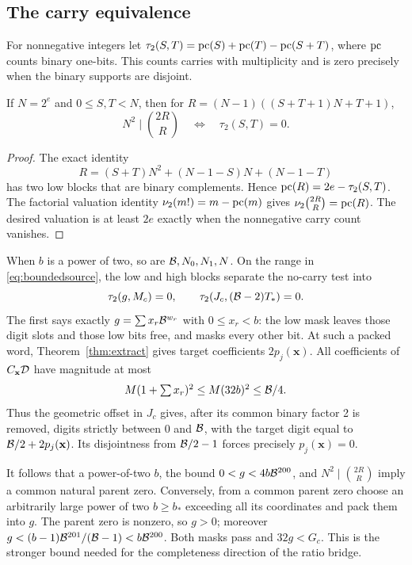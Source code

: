 \subsection{The carry equivalence}
For nonnegative integers let
$\tau_2(S,T)=\operatorname{pc}(S)+\operatorname{pc}(T)-\operatorname{pc}(S+T)$, where $\operatorname{pc}$ counts binary
one-bits. This counts carries with multiplicity and is zero precisely
when the binary supports are disjoint.

\begin{lemma}\label{lem:carry}
If $N=2^e$ and $0\le S,T<N$, then for
$R=(N-1)((S+T+1)N+T+1)$,
\[
 N^2\mid\binom{2R}{R}\quad\Longleftrightarrow\quad\tau_2(S,T)=0.
\]
\end{lemma}
\begin{proof}
The exact identity
\[
R=(S+T)N^2+(N-1-S)N+(N-1-T)
\]
has two low blocks that are binary complements. Hence
$\operatorname{pc}(R)=2e-\tau_2(S,T)$. The factorial valuation identity
$\nu_2(m!)=m-\operatorname{pc}(m)$ gives
$\nu_2\binom{2R}{R}=\operatorname{pc}(R)$. The desired valuation is at least
$2e$ exactly when the nonnegative carry count vanishes.
\end{proof}

When $b$ is a power of two, so are $\mathcal B,N_0,N_1,N$.
On the range in \eqref{eq:boundedsource}, the low and high blocks
separate the no-carry test into
\[
\tau_2(g,M_c)=0,\qquad
\tau_2(J_c,(\mathcal B-2)T_*)=0.
\]
The first says exactly
$g=\sum x_r\mathcal B^{w_r}$ with $0\le x_r<b$: the low mask leaves
those digit slots and those low bits free, and masks every other bit.
At such a packed word, Theorem~\ref{thm:extract} gives target
coefficients $2p_j(\mathbf x)$. All coefficients of
$C_{\mathbf x}\mathcal D$ have magnitude at most
\[
 M(1+\textstyle\sum x_r)^2\le M(32b)^2\le\mathcal B/4.
\]
Thus the geometric offset in $J_c$ gives, after its common binary
factor 2 is removed, digits strictly between 0 and $\mathcal B$, with the
target digit equal to $\mathcal B/2+2p_j(\mathbf x)$. Its disjointness
from $\mathcal B/2-1$ forces precisely $p_j(\mathbf x)=0$.

It follows that a power-of-two $b$, the bound $0<g<4b\mathcal B^{200}$,
and $N^2\mid\binom{2R}{R}$ imply a common natural parent zero.
Conversely, from a common parent zero choose an arbitrarily large
power of two $b\ge b_*$ exceeding all its coordinates and pack them
into $g$. The parent zero is nonzero, so $g>0$; moreover
$g<(b-1)\mathcal B^{201}/(\mathcal B-1)<b\mathcal B^{200}$.
Both masks pass and $32g<G_c$. This is the stronger bound needed
for the completeness direction of the ratio bridge.

